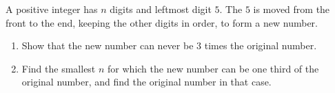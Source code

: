 A positive integer has $n$ digits and leftmost digit $5$. The $5$ is moved from the front to the end, keeping the other digits in order, to form a new number.
\begin{enumerate}
\item[(a)] Show that the new number can never be $3$ times the original number.
\item[(b)] Find the smallest $n$ for which the new number can be one third of the original number, and find the original number in that case.
\end{enumerate}
